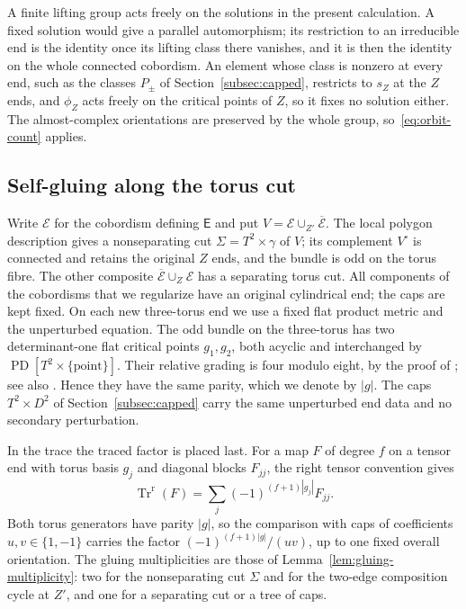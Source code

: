 \documentclass[11pt]{amsart}
\theoremstyle{definition}
\theoremstyle{remark}
\theoremstyle{plain}
\numberwithin{equation}{section}
\newcommand{\PD}{\operatorname{PD}}
\begin{document}
A finite lifting group acts freely on the solutions in the present
calculation. A fixed solution would give a parallel automorphism; its
restriction to an irreducible end is the identity once its lifting class
there vanishes, and it is then the identity on the whole connected cobordism.
An element whose class is nonzero at every end, such as the classes $P_\pm$
of Section~\ref{subsec:capped}, restricts to $s_Z$ at the $Z$ ends, and
$\phi_Z$ acts freely on the critical points of $Z$, so it fixes no solution
either. The almost-complex
orientations are preserved by the whole group, so~\eqref{eq:orbit-count}
applies.

\subsection{Self-gluing along the torus cut}
\label{sec:ordinary-selfgluing}
Write $\mathcal E$ for the cobordism defining $\mathsf E$ and put
$V=\mathcal E\cup_{Z'}\overline{\mathcal E}$. The local polygon description
gives a nonseparating cut $\Sigma=T^2\times\gamma$ of $V$; its complement
$V^\circ$ is connected and retains the original $Z$ ends, and the bundle is
odd on the torus fibre. The other composite $\overline{\mathcal E}\cup_Z\mathcal E$
has a separating torus cut. All components of the cobordisms that we
regularize have an original cylindrical end; the caps are kept fixed. On each
new three-torus end we use a fixed flat product metric and the unperturbed
equation. The odd bundle on the three-torus has two determinant-one flat
critical points $g_1,g_2$, both acyclic and interchanged by
$\PD[T^2\times\{\mathrm{point}\}]$. Their relative grading is four modulo
eight, by the proof of \cite[Proposition~5.2(a)]{KM-unknot}; see also
\cite[Lemma~5.3]{KM-unknot}. Hence they have the same parity, which we denote
by $|g|$. The caps $T^2\times D^2$ of Section~\ref{subsec:capped} carry the
same unperturbed end data and no secondary perturbation.

In the trace the traced factor is placed last. For a map $F$ of degree $f$ on
a tensor end with torus basis $g_j$ and diagonal blocks $F_{jj}$, the right
tensor convention gives
\begin{equation}\label{eq:ordinary-right-trace}
 \operatorname{Tr}^{\mathrm r}(F)=\sum_j(-1)^{(f+1)|g_j|}F_{jj}.
\end{equation}
Both torus generators have parity $|g|$, so the comparison with caps of
coefficients $u,v\in\{1,-1\}$ carries the factor $(-1)^{(f+1)|g|}/(uv)$, up
to one fixed overall orientation. The gluing multiplicities are those of
Lemma~\ref{lem:gluing-multiplicity}: two for the nonseparating cut $\Sigma$
and for the two-edge composition cycle at $Z'$, and one for a separating cut
or a tree of caps.
\end{document}
